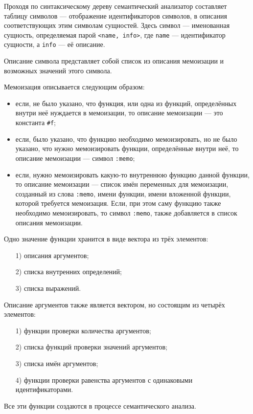     Проходя по синтаксическому дереву семантический анализатор составляет таблицу символов --- отображение идентификаторов символов, в описания соответствующих этим символам сущностей\cite{skor}.
    Здесь символ --- именованная сущность, определяемая парой \verb!<name, info>!, где \verb,name, --- идентификатор сущности, а \verb,info, --- её описание.

    Описание символа представляет собой список из описания мемоизации и возможных значений этого символа.

    Мемоизация описывается следующим образом:
        \begin{itemize}
            \item если, не было указано, что функция, или одна из функций, определённых внутри неё нуждается в мемоизации, то описание мемоизации --- это константа \verb,#f,;
            \item если, было указано, что функцию необходимо мемоизировать, но не было указано, что нужно мемоизировать функции, определённые внутри неё, то описание мемоизации --- символ \verb,:memo,;
            \item если, нужно мемоизировать какую-то внутреннюю функцию данной функции, то описание мемоизации --- список имён переменных для мемоизации, созданный из слова \verb,:memo,, имени функции, имени вложенной функции, которой требуется мемоизация.
                  Если, при этом саму функцию также необходимо мемоизировать, то символ \verb,:memo,, также добавляется в список описания мемоизации.
        \end{itemize}
    \clearpage
    Одно значение функции хранится в виде вектора из трёх элементов:
    \begin{enumerate}
        \item[1)] описания аргументов;
        \item[2)] списка внутренних определений;
        \item[3)] списка выражений.
    \end{enumerate}

    Описание аргументов также является вектором, но состоящим из четырёх элементов:
    \begin{enumerate}
        \item[1)] функции проверки количества аргументов;
        \item[2)] списка функций проверки значений аргументов;
        \item[3)] списка имён аргументов;
        \item[4)] функции проверки равенства аргументов с одинаковыми идентификаторами.
    \end{enumerate}
    Все эти функции создаются в процессе семантического анализа.

